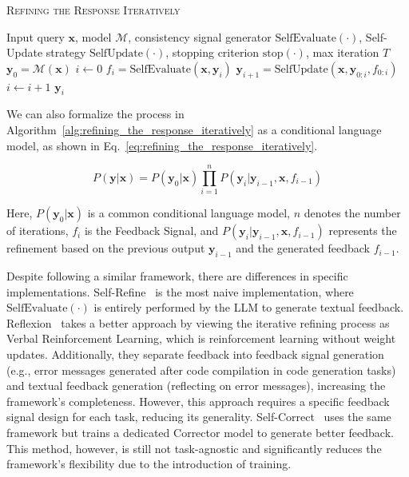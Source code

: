 \documentclass[lettersize,journal]{IEEEtran}
\begin{document}
\begin{algorithm}[h]
\small
\caption{\textsc{Refining the Response Iteratively}}
\label{alg:refining_the_response_iteratively}
\begin{algorithmic}[1]
\REQUIRE Input query $\boldsymbol{x}$, model $\mathcal{M}$, consistency signal generator $\text{SelfEvaluate}(\cdot)$, Self-Update strategy $\text{SelfUpdate}(\cdot)$, stopping criterion $\text{stop}(\cdot)$, max iteration $T$
\STATE $\boldsymbol{y}_0 = \mathcal{M}(\boldsymbol{x})$
\STATE $i \gets 0$
    \STATE $f_i = \text{SelfEvaluate}(\boldsymbol{x}, \boldsymbol{y}_i)$
    \STATE $\boldsymbol{y}_{i+1} = \text{SelfUpdate}(\boldsymbol{x}, \boldsymbol{y}_{0:i}, f_{0:i})$
    \STATE $i \gets i + 1$
\ENDWHILE
\RETURN $\boldsymbol{y}_i$
\end{algorithmic}
\end{algorithm}

We can also formalize the process in Algorithm~\ref{alg:refining_the_response_iteratively} as a conditional language model, as shown in Eq.~\ref{eq:refining_the_response_iteratively}.

\begin{equation}
    P(\boldsymbol{y}|\boldsymbol{x}) = P(\boldsymbol{y}_0|\boldsymbol{x}) \prod_{i=1}^{n} P(\boldsymbol{y}_i|\boldsymbol{y}_{i-1}, \boldsymbol{x}, f_{i-1})
    \label{eq:refining_the_response_iteratively}
\end{equation}

Here, $P(\boldsymbol{y}_0|\boldsymbol{x})$ is a common conditional language model, $n$ denotes the number of iterations, $f_i$ is the Feedback Signal, and $P(\boldsymbol{y}_i|\boldsymbol{y}_{i-1}, \boldsymbol{x}, f_{i-1})$ represents the refinement based on the previous output $\boldsymbol{y}_{i-1}$ and the generated feedback $f_{i-1}$.

Despite following a similar framework, there are differences in specific implementations. Self-Refine~\cite{SelfRefine_23_NeuIPS_CMU} is the most naive implementation, where $\text{SelfEvaluate}(\cdot)$ is entirely performed by the LLM to generate textual feedback. Reflexion~\cite{Reflexion_23_NeuIPS_Northeastern} takes a better approach by viewing the iterative refining process as Verbal Reinforcement Learning, which is reinforcement learning without weight updates. Additionally, they separate feedback into feedback signal generation (e.g., error messages generated after code compilation in code generation tasks) and textual feedback generation (reflecting on error messages), increasing the framework's completeness. However, this approach requires a specific feedback signal design for each task, reducing its generality. Self-Correct~\cite{SelfCorrect_23_ICLR_AI2} uses the same framework but trains a dedicated Corrector model to generate better feedback. This method, however, is still not task-agnostic and significantly reduces the framework's flexibility due to the introduction of training.
\end{document}

